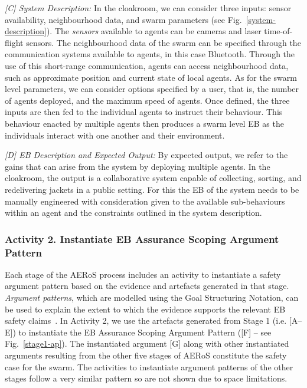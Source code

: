 \documentclass[runningheads]{llncs}
\begin{document}

\emph{[C] System Description:}
In the cloakroom, we can consider three inputs: sensor availability, neighbourhood data, and swarm parameters (see Fig.~\ref{system-description}). The \emph{sensors} available to agents can be cameras and laser time-of-flight sensors. 
The neighbourhood data of the swarm can be specified through the communication systems available to agents, in this case Bluetooth. 
Through the use of this short-range communication, agents can access neighbourhood data, such as approximate position and current state of local agents.  
As for the swarm level parameters, we can consider options specified by a user, that is, the number of agents deployed, and the maximum speed of agents. %
Once defined, the three inputs are then fed to the individual agents to instruct their behaviour. This behaviour enacted by multiple agents then produces a swarm level EB as the individuals interact with one another and their environment.

\emph{[D] EB Description and Expected Output:}
By expected output, we refer to the gains that can arise from the system by deploying multiple agents. 
In the cloakroom, the output is a collaborative system capable of collecting, sorting, and redelivering jackets in a public setting. 
For this the EB of the system needs to be manually engineered with consideration given to the available sub-behaviours within an agent and the constraints outlined in the system description.

\subsubsection*{Activity 2. Instantiate EB Assurance Scoping Argument Pattern}
Each stage of the AERoS process includes an activity to instantiate a safety argument pattern based on the evidence and artefacts generated in that stage. %
\emph{Argument patterns}, which are modelled using the Goal Structuring Notation, can be used to explain the extent to which the evidence supports the relevant EB safety claims~\cite{Hawkins2021}.  
In Activity 2, we use the artefacts generated from Stage 1 (i.e. [A–E]) to instantiate the EB Assurance Scoping Argument Pattern ([F] – see Fig.~\ref{stage1-ap}). 
The instantiated argument [G] along with other instantiated arguments resulting from the other five stages of AERoS constitute the safety case for the swarm. The activities to instantiate argument patterns of the other stages follow a very similar pattern so are not shown due to space limitations.
\end{document}
